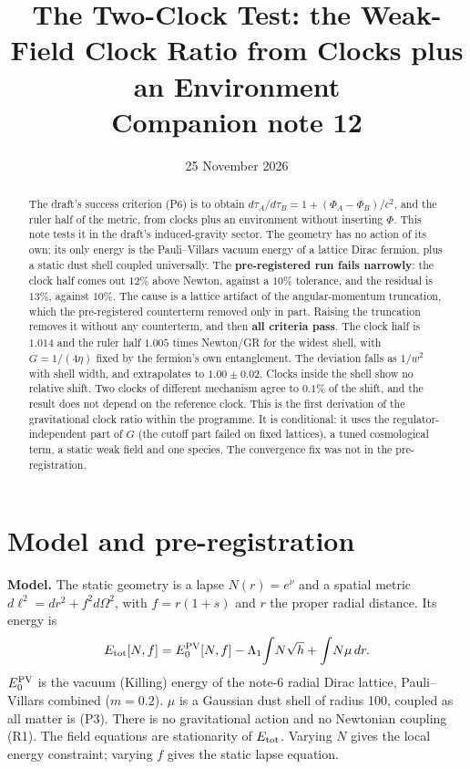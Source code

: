 \documentclass[11pt]{article}
\title{The Two-Clock Test: the Weak-Field Clock Ratio from Clocks plus an Environment\\[4pt]\large Companion note 12}
\author{}\date{25 November 2026}
\begin{document}
\maketitle
\begin{abstract}
The draft's success criterion (P6) is to obtain $d\tau_A/d\tau_B=1+(\Phi_A-\Phi_B)/c^2$, and the ruler half of the metric, from clocks plus an environment without inserting $\Phi$. This note tests it in the draft's induced-gravity sector. The geometry has no action of its own; its only energy is the Pauli--Villars vacuum energy of a lattice Dirac fermion, plus a static dust shell coupled universally. The \textbf{pre-registered run fails narrowly}: the clock half comes out $12\%$ above Newton, against a $10\%$ tolerance, and the residual is $13\%$, against $10\%$. The cause is a lattice artifact of the angular-momentum truncation, which the pre-registered counterterm removed only in part. Raising the truncation removes it without any counterterm, and then \textbf{all criteria pass}. The clock half is $1.014$ and the ruler half $1.005$ times Newton/GR for the widest shell, with $G=1/(4\eta)$ fixed by the fermion's own entanglement. The deviation falls as $1/w^2$ with shell width, and extrapolates to $1.00\pm0.02$. Clocks inside the shell show no relative shift. Two clocks of different mechanism agree to $0.1\%$ of the shift, and the result does not depend on the reference clock. This is the first derivation of the gravitational clock ratio within the programme. It is conditional: it uses the regulator-independent part of $G$ (the cutoff part failed on fixed lattices), a tuned cosmological term, a static weak field and one species. The convergence fix was not in the pre-registration.
\end{abstract}

\section{Model and pre-registration}
\textbf{Model.} The static geometry is a lapse $N(r)=e^{\nu}$ and a spatial metric $d\ell^2=dr^2+f^2d\Omega^2$, with $f=r(1+s)$ and $r$ the proper radial distance. Its energy is
\[
E_{\rm tot}[N,f]=E_0^{\rm PV}[N,f]-\Lambda_1\!\int\!N\sqrt h+\int\!N\mu\,dr .
\]
$E_0^{\rm PV}$ is the vacuum (Killing) energy of the note-6 radial Dirac lattice, Pauli--Villars combined ($m=0.2$). $\mu$ is a Gaussian dust shell of radius 100, coupled as all matter is (P3). There is no gravitational action and no Newtonian coupling (R1). The field equations are stationarity of $E_{\rm tot}$. Varying $N$ gives the local energy constraint; varying $f$ gives the static lapse equation.
\end{document}
